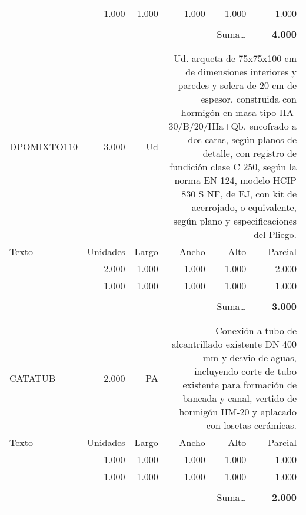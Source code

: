\documentclass{book}%
\begin{document}
\begin{longtable}{lrrrrr}
\multicolumn{1}{p{3.5cm}}{}&1.000&1.000&1.000&1.000&1.000\\%
&&&&&\\%
\multicolumn{5}{r}{Suma\ldots}&\textbf{4.000}\\%
\hline%
&&&&&\\%
&&&&&\\%
DPOMIXTO110&3.000& Ud&\multicolumn{3}{p{6cm}}{\scriptsize Ud. arqueta de 75x75x100 cm de dimensiones interiores y paredes y solera de 20 cm de espesor, construida con hormigón en masa tipo HA-30/B/20/IIIa+Qb, encofrado a dos caras, según planos de detalle, con registro de fundición clase C 250, según la norma EN 124, modelo HCIP 830 S NF, de EJ, con kit de acerrojado, o equivalente, según plano y especificaciones del Pliego.\normalsize}\\%
Texto&Unidades&Largo&Ancho&Alto&Parcial\\%
\hline%
\multicolumn{1}{p{3.5cm}}{}&2.000&1.000&1.000&1.000&2.000\\%
\multicolumn{1}{p{3.5cm}}{}&1.000&1.000&1.000&1.000&1.000\\%
&&&&&\\%
\multicolumn{5}{r}{Suma\ldots}&\textbf{3.000}\\%
\hline%
&&&&&\\%
&&&&&\\%
CATATUB&2.000& PA&\multicolumn{3}{p{6cm}}{\scriptsize Conexión a tubo de alcantrillado existente DN 400 mm y desvio de aguas, incluyendo corte de tubo existente para formación de bancada y canal, vertido de hormigón HM-20 y aplacado con losetas cerámicas.\normalsize}\\%
Texto&Unidades&Largo&Ancho&Alto&Parcial\\%
\hline%
\multicolumn{1}{p{3.5cm}}{}&1.000&1.000&1.000&1.000&1.000\\%
\multicolumn{1}{p{3.5cm}}{}&1.000&1.000&1.000&1.000&1.000\\%
&&&&&\\%
\multicolumn{5}{r}{Suma\ldots}&\textbf{2.000}\\%
\hline%
&&&&&\\%
\end{longtable}%
\newpage

%
\end{document}
